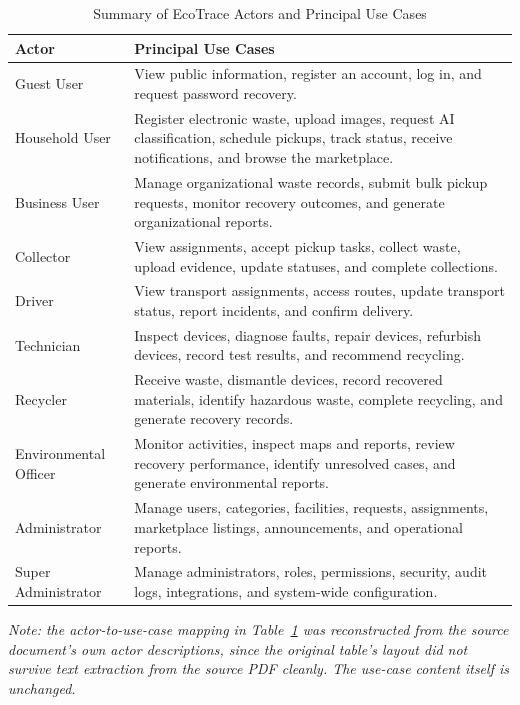 \begin{table}[H]
\centering
\small
\caption{Summary of EcoTrace Actors and Principal Use Cases}
\label{tab:actor-summary}
\begin{tabular}{@{}p{3.2cm}p{9.4cm}@{}}
\toprule
\textbf{Actor} & \textbf{Principal Use Cases} \\
\midrule
Guest User & View public information, register an account, log in, and request password recovery. \\
Household User & Register electronic waste, upload images, request AI classification, schedule pickups, track status, receive notifications, and browse the marketplace. \\
Business User & Manage organizational waste records, submit bulk pickup requests, monitor recovery outcomes, and generate organizational reports. \\
Collector & View assignments, accept pickup tasks, collect waste, upload evidence, update statuses, and complete collections. \\
Driver & View transport assignments, access routes, update transport status, report incidents, and confirm delivery. \\
Technician & Inspect devices, diagnose faults, repair devices, refurbish devices, record test results, and recommend recycling. \\
Recycler & Receive waste, dismantle devices, record recovered materials, identify hazardous waste, complete recycling, and generate recovery records. \\
Environmental Officer & Monitor activities, inspect maps and reports, review recovery performance, identify unresolved cases, and generate environmental reports. \\
Administrator & Manage users, categories, facilities, requests, assignments, marketplace listings, announcements, and operational reports. \\
Super Administrator & Manage administrators, roles, permissions, security, audit logs, integrations, and system-wide configuration. \\
\bottomrule
\end{tabular}
\end{table}

\textit{Note: the actor-to-use-case mapping in Table~\ref{tab:actor-summary} was
reconstructed from the source document's own actor descriptions, since the
original table's layout did not survive text extraction from the source PDF
cleanly. The use-case content itself is unchanged.}

